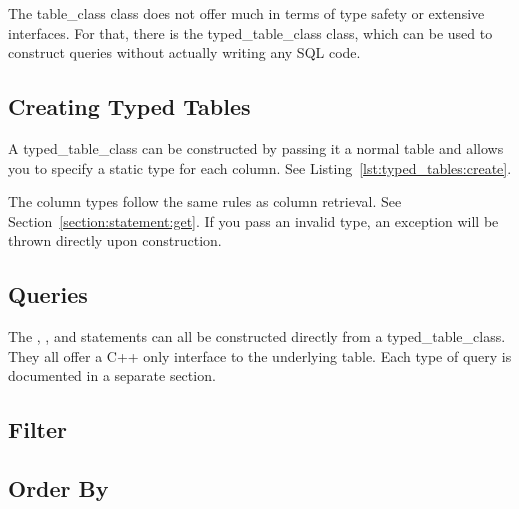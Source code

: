The \gls{table_class} class does not offer much in terms of type safety or extensive interfaces. For that, there is the \gls{typed_table_class} class, which can be used to construct queries without actually writing any SQL code.

\subsection{Creating Typed Tables}
\label{section:typed_tables:create}

A \gls{typed_table_class} can be constructed by passing it a normal table and allows you to specify a static type for each column. See Listing~\ref{lst:typed_tables:create}.



The column types follow the same rules as column retrieval. See Section~\ref{section:statement:get}. If you pass an invalid type, an exception will be thrown directly upon construction.

\subsection{Queries}
\label{section:typed_tables:queries}

The , ,  and  statements can all be constructed directly from a \gls{typed_table_class}. They all offer a C++ only interface to the underlying table. Each type of query is documented in a separate section.


\subsection{Filter}


\subsection{Order By}

